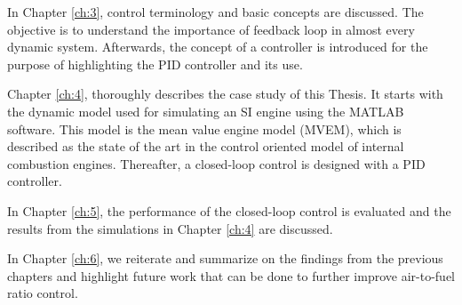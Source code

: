 In Chapter \ref{ch:3}, control terminology and basic concepts are discussed. The objective is to understand the importance of feedback loop in almost every dynamic system. Afterwards, the concept of a controller is introduced for the purpose of highlighting the PID controller and its use.

Chapter \ref{ch:4}, thoroughly describes the case study of this Thesis. It starts with the dynamic model used for simulating an SI engine using the MATLAB software. This model is the mean value engine model (MVEM), which is described as the state of the art in the control oriented model of internal combustion engines. Thereafter, a closed-loop control is designed with a PID controller. 

In Chapter \ref{ch:5}, the performance of the closed-loop control is evaluated and the results from the simulations in Chapter \ref{ch:4} are discussed. 

In Chapter \ref{ch:6}, we reiterate and summarize on the findings from the previous chapters and highlight future work that can be done to further improve air-to-fuel ratio control.




